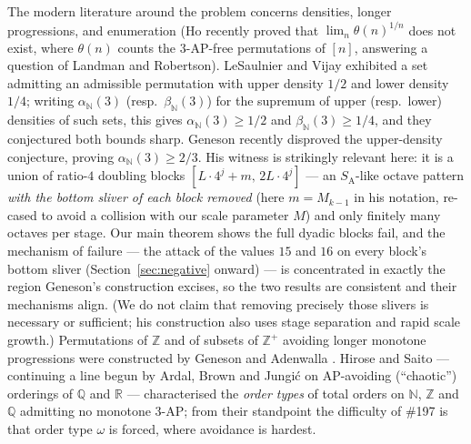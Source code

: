 \documentclass[11pt]{article}
\theoremstyle{definition}
\newcommand{\Z}{\mathbb{Z}}
\newcommand{\N}{\mathbb{N}}
\newcommand{\SA}{S_{\mathrm{A}}}
\begin{document}
The modern literature around the problem concerns densities, longer
progressions, and enumeration (Ho \cite{Ho26} recently proved that
$\lim_n \theta(n)^{1/n}$ does not exist, where $\theta(n)$ counts the
$3$-AP-free permutations of $[n]$, answering a question of Landman and
Robertson). LeSaulnier and Vijay \cite{LV11} exhibited a set admitting an
admissible permutation with upper density $1/2$ and lower density $1/4$;
writing $\alpha_{\N}(3)$ (resp.\ $\beta_{\N}(3)$) for the supremum of upper
(resp.\ lower) densities of such sets, this gives $\alpha_{\N}(3) \ge 1/2$
and $\beta_{\N}(3) \ge 1/4$, and they conjectured both bounds sharp.
Geneson \cite{Gen26} recently disproved the upper-density conjecture, proving
$\alpha_{\N}(3) \ge 2/3$. His witness is strikingly relevant here: it is a
union of ratio-$4$ doubling blocks $[L\cdot 4^j + m,\, 2L\cdot 4^j]$ --- an
$\SA$-like octave pattern \emph{with the bottom sliver of each block
removed} (here $m = M_{k-1}$ in his notation, re-cased to avoid a collision
with our scale parameter $M$) and only finitely many octaves per stage. Our
main theorem shows the full dyadic blocks fail, and the mechanism of failure
--- the attack of the values $15$ and $16$ on every block's bottom sliver
(Section~\ref{sec:negative} onward) --- is concentrated in exactly the
region Geneson's construction excises, so the two results are consistent
and their mechanisms align. (We do not claim that
removing precisely those slivers is necessary or sufficient; his
construction also uses stage separation and rapid scale growth.) Permutations of $\Z$ and of subsets of $\Z^+$
avoiding longer monotone progressions were constructed by Geneson
\cite{Gen18} and Adenwalla \cite{Ad24}. Hirose and Saito \cite{HS24} ---
continuing a line begun by Ardal, Brown and Jungi\'c \cite{ABJ11} on
AP-avoiding (``chaotic'') orderings of $\mathbb{Q}$ and $\mathbb{R}$ ---
characterised the \emph{order types} of total orders on $\N$, $\Z$ and $\mathbb{Q}$
admitting no monotone 3-AP; from their standpoint the difficulty of \#197 is
that order type $\omega$ is forced, where avoidance is hardest.
\end{document}
